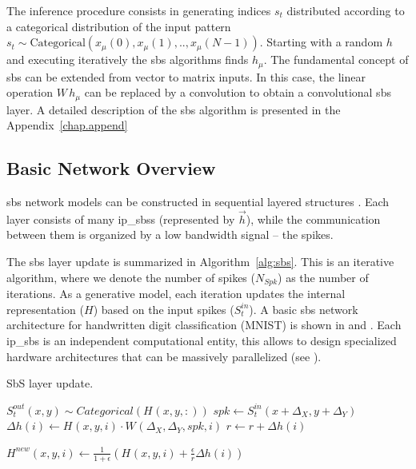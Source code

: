 	The inference procedure consists in generating indices $s_t$
	distributed according to a categorical distribution of the input pattern
	$s_t \sim \mathrm{Categorical}(x_{\mu}(0), x_{\mu}(1), ..,
	x_{\mu}(N-1))$. Starting with a random $h$ and executing
	iteratively  the \gls{sbs} algorithms finds
	$h_{\mu}$. The fundamental concept of \gls{sbs} can be extended from vector to matrix
	inputs. In this case, the linear operation $W\, h_\mu$ can be replaced by a
	convolution to obtain a convolutional \gls{sbs} layer. A detailed description of the \gls{sbs} algorithm is presented in the Appendix~\ref{chap.append}

\subsection{Basic Network Overview}

\gls{sbs} network models can be constructed in sequential layered structures \cite{rotermund2019Backpropagation}. Each layer consists of many \gls{ip_sbs}s (represented by $\vec{h}$), while the communication between them is organized by a low bandwidth signal -- the spikes.

The \gls{sbs} layer update is summarized in Algorithm~\ref{alg:sbs}. This is an iterative algorithm, where we denote the number of spikes ($N_{Spk}$) as the number of iterations. As a generative model, each iteration updates the internal representation ($H$) based on the input spikes ($S^{in}_t$). A basic \gls{sbs} network architecture for handwritten digit classification (MNIST) is shown in  and . Each \gls{ip_sbs} is an independent computational entity, this allows to design specialized hardware architectures that can be massively parallelized (see ).


\begin{algorithm}[b!]
	\caption{SbS layer update.}\label{alg:sbs}
	
	\begin{algorithmic}[1]
		\STATE $S^{out}_t(x, y) \sim Categorical( H^{}(x, y, :) ) $
		\STATE $spk \leftarrow S^{in}_t(x + \Delta_X , y + \Delta_Y)$
		\STATE $\Delta h(i)
		\leftarrow H^{}(x, y,  i) \cdot W^{}(\Delta_X, \Delta_Y, spk, i)$
		\STATE $r \leftarrow r + \Delta h(i)$
		\ENDFOR
		
		\STATE $H^{new}(x, y, i) \leftarrow \frac{1}{1+\epsilon} \left( H^{}(x, y, i) + \frac{\epsilon}{r} \Delta h(i) \right) $              
		\ENDFOR
		\ENDFOR
		\ENDFOR
		\ENDFOR
	\end{algorithmic} 
\end{algorithm}

